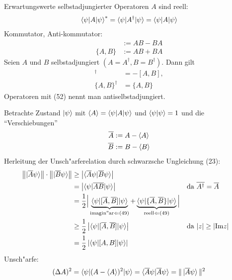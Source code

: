 \documentclass[a4paper]{scrartcl}
\renewcommand{\Im}{\ensuremath \mathrm{Im}}
\begin{document}
{Erwartungswerte selbstadjungierter Operatoren $A$ sind reell:
\begin{align} \braket{ \psi | A | \psi}^* = \braket{ \psi | A^\dagger | \psi} = \braket{ \psi | A | \psi}
\end{align}
Kommutator, Anti-kommutator:
\begin{align}
[A,B] & := AB - BA \\
\{ A,B \} & := AB + BA
\end{align}
Seien $A$ und $B$ selbstadjungiert $(A = A^\dagger, B = B ^\dagger)$. Dann gilt
\begin{align}
[A,B]^\dagger & = - [A,B], \\
\{ A, B \}^\dagger & = \{ A, B \}
\end{align}
Operatoren mit (52) nennt man antiselbstadjungiert.

Betrachte Zustand $\ket \psi$ mit $\braket A = \braket { \psi | A | \psi }$ und $\braket {\psi |\psi }=1$ und die "`Verschiebungen"'
\begin{align}
\begin{split}
\overline A & := A - \braket A \\
\overline B & := B - \braket B 
\end{split}
\end{align}
Herleitung der Unsch"arferelation durch schwarzsche Ungleichung (23):
\begin{align}
\left\Vert \ket { \overline A \psi } \right\Vert \cdot \left\Vert \ket { \overline B \psi }  \right\Vert & \geq \left\vert \braket { \overline A \psi | \overline B \psi } \right\vert \notag\\
& = \left\vert \braket{ \psi | \overline A \overline B | \psi } \right \vert &&  \mathrm{da \ } \overline{ A ^\dagger} = \overline A \notag\\
&  = \frac12 \Big\vert \underbrace{ \braket{ \psi | [\overline A, \overline B ] | \psi}}_{\mathrm{imagin"ar} \Leftarrow \mathrm{(49)}} + \underbrace{\braket { \psi | \{ \overline A, \overline B \} | \psi }}_{\mathrm{reell} \Leftarrow \mathrm{(49)}} \Big\vert \notag\\
& \geq \frac12 \left\vert \braket{\psi | [\overline A, \overline B] | \psi} \right\vert && \mathrm{da \ } \vert z \vert \geq \vert \Im z \vert \notag\\
& = \frac12 \left\vert \braket { \psi | [A,B] | \psi } \right\vert
\end{align}
Unsch"arfe:
$$(\Delta A)^2 = \braket{ \psi | (A - \braket A )^2 | \psi } = \braket{ \overline A \psi | \overline A \psi } = \Vert \ket { \overline A \psi } \Vert^2$$
}
\end{document}
